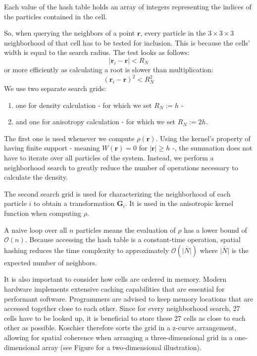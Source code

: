 Each value of the hash table holds an array of integers representing the indices of the particles contained in the cell.

So, when querying the neighbors of a point $\textbf{r}$, every particle in the $3 \times 3 \times 3$ neighborhood of that cell has to be tested for inclusion. This is because the cells' width is equal to the search radius. The test looks as follows:
\[ |\textbf{r}_i - \textbf{r}| < R_N \]
or more efficiently as calculating a root is slower than multiplication:
\[ (\textbf{r}_i - \textbf{r})^2 < R_N^2 \]
We use two separate search grids:
\begin{enumerate}
    \item one for density calculation - for which we set $R_N := h$ -
    \item and one for anisotropy calculation - for which we set $R_N := 2h$.
\end{enumerate}

The first one is used whenever we compute $\rho(\textbf{r})$. Using the kernel's property of having finite support - meaning $W(\textbf{r}) = 0$ for $|\textbf{r}| \geq h$ -, the summation does not have to iterate over all particles of the system. Instead, we perform a neighborhood search to greatly reduce the number of operations necessary to calculate the density.

The second search grid is used for characterizing the neighborhood of each particle $i$ to obtain a transformation $\textbf{G}_i$. It is used in the anisotropic kernel function when computing $\rho$.

A naive loop over all $n$ particles means the evaluation of $\rho$ has a lower bound of $\mathcal{O}(n)$. Because accessing the hash table is a constant-time operation, spatial hashing reduces the time complexity to approximately $\mathcal{O}(\overline{|N|})$ where $\overline{|N|}$ is the expected number of neighbors.

It is also important to consider how cells are ordered in memory. Modern hardware implements extensive caching capabilities that are essential for performant software. Programmers are advised to keep memory locations that are accessed together close to each other. Since for every neighborhood search, 27 cells have to be looked up, it is beneficial to store these 27 cells as close to each other as possible. Koschier therefore sorts the grid in a z-curve arrangement, allowing for spatial coherence when arranging a three-dimensional grid in a one-dimensional array (see Figure  for a two-dimensional illustration).

